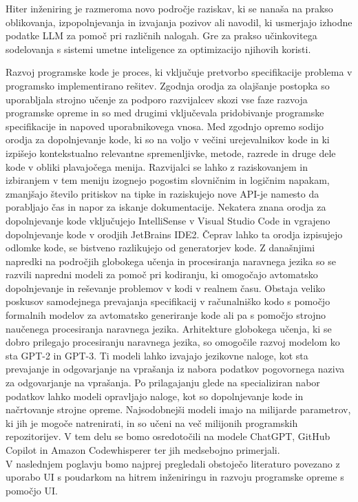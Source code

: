 \documentclass[a4paper,12pt,openright]{book}
\begin{document}
Hiter inženiring je razmeroma novo področje raziskav, ki se nanaša na prakso oblikovanja, izpopolnjevanja in izvajanja pozivov ali navodil, ki usmerjajo izhodne podatke LLM za pomoč pri različnih nalogah. Gre za prakso učinkovitega sodelovanja s sistemi umetne inteligence za optimizacijo njihovih koristi.
\cite{info:doi/10.2196/50638}

Razvoj programske kode je proces, ki vključuje pretvorbo specifikacije problema v programsko implementirano rešitev. Zgodnja orodja za olajšanje postopka so uporabljala strojno učenje za podporo razvijalcev skozi vse faze razvoja programske opreme in so med drugimi vključevala pridobivanje programske specifikacije in napoved uporabnikovega vnosa.
Med zgodnjo opremo sodijo orodja za dopolnjevanje kode, ki so na voljo v večini urejevalnikov kode in ki izpišejo kontekstualno relevantne spremenljivke, metode, razrede in druge dele kode v obliki plavajočega menija. Razvijalci se lahko z raziskovanjem in izbiranjem v tem meniju izognejo pogostim slovničnim in logičnim napakam, zmanjšajo število pritiskov na tipke in raziskujejo nove API-je namesto da porabljajo čas in napor za iskanje dokumentacije. Nekatera znana orodja za dopolnjevanje kode vključujejo IntelliSense v Visual Studio Code in vgrajeno dopolnjevanje kode v orodjih JetBrains IDE2. 
Čeprav lahko ta orodja izpisujejo odlomke kode, se bistveno razlikujejo od generatorjev kode.
Z današnjimi napredki na področjih globokega učenja in procesiranja naravnega jezika so se razvili napredni modeli za pomoč pri kodiranju, ki omogočajo avtomatsko dopolnjevanje in reševanje problemov v kodi v realnem času.
Obstaja veliko poskusov samodejnega prevajanja specifikacij v računalniško kodo s pomočjo formalnih modelov za avtomatsko generiranje kode ali pa s pomočjo strojno naučenega procesiranja naravnega jezika. Arhitekture globokega učenja, ki se dobro prilegajo procesiranju naravnega jezika, so omogočile razvoj modelom ko sta GPT-2 in GPT-3. Ti modeli lahko izvajajo jezikovne naloge, kot sta prevajanje in odgovarjanje na vprašanja iz nabora podatkov pogovornega naziva za odgovarjanje na vprašanja. \cite{hu2019re} Po prilagajanju glede na specializiran nabor podatkov lahko modeli opravljajo naloge, kot so dopolnjevanje kode in načrtovanje strojne opreme.  Najsodobnejši modeli imajo na milijarde parametrov, ki jih je mogoče natrenirati, in so učeni na več milijonih programskih repozitorijev. V tem delu se bomo osredotočili na modele ChatGPT, GitHub Copilot in Amazon Codewhisperer ter jih medsebojno primerjali. \\
V naslednjem poglavju bomo najprej pregledali obstoječo literaturo povezano z uporabo UI s poudarkom na hitrem inženiringu in razvoju programske opreme s pomočjo UI. 
\cite{zhang2003machine}
\end{document}
